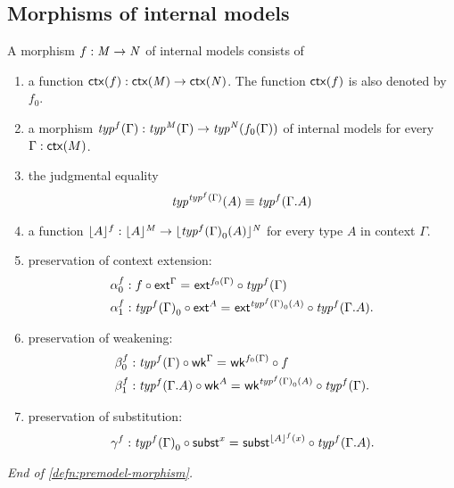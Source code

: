 \subsection{Morphisms of internal models}
\begin{defn}\label{defn:premodel-morphism}
A morphism $f:\mfM\to \mfN$ of internal models consists of
\begin{enumerate}
\item a function $\ctx(f):\ctx(\mfM)\to\ctx(\mfN)$. The function $\ctx(f)$ is also
denoted by $f_0$.
\item a morphism $\mftyp{f}{\Gamma}:\mftyp{\mfM}{\Gamma}\to\mftyp{\mfN}{f_0(\Gamma)}$ of internal models for every
$\Gamma:\ctx(M)$.
\item the judgmental equality
\begin{equation*}
\mftyp{\mftyp{f}{\Gamma}}{A}\jdeq\mftyp{f}{\ctxext{\Gamma}{A}}
\end{equation*}
\item a function $\terms[f]{A}:\terms[\mfM]{A}\to\terms[\mfN]{\mftyp{f}{\Gamma}_0(A)}$ for
every type $A$ in context $\Gamma$. 
\item preservation of context extension: 
\begin{align*}
\alpha^f_0 & :\id{f\circ\tfext^\Gamma}{\tfext^{f_0(\Gamma)}\circ\mftyp{f}{\Gamma}}\\
\alpha^f_1 & :\id{\mftyp{f}{\Gamma}_0\circ\tfext^A}{\tfext^{\mftyp{f}{\Gamma}_0(A)}\circ\mftyp{f}{\ctxext{\Gamma}{A}}}.
\end{align*}
\item preservation of weakening: 
\begin{align*}
\beta^f_0 & :\id{\mftyp{f}{\Gamma}\circ\tfwk^\Gamma}{\tfwk^{f_0(\Gamma)}\circ f}\\
\beta^f_1 & :\id{\mftyp{f}{\ctxext{\Gamma}{A}}\circ\tfwk^A}{\tfwk^\protect{\mftyp{f}{\Gamma}_0(A)}\circ\mftyp{f}{\Gamma}}.
\end{align*}
\item preservation of substitution: 
\begin{equation*}
\gamma^f:\id{\mftyp{f}\Gamma_0\circ\tfsubst^x}{\tfsubst^\protect{\terms[f]{A}(x)}\circ\mftyp{f}{\ctxext{\Gamma}{A}}}.
\end{equation*}
\end{enumerate}
\begin{flushright}
\textsl{End of \autoref{defn:premodel-morphism}.}
\end{flushright}
\end{defn}

